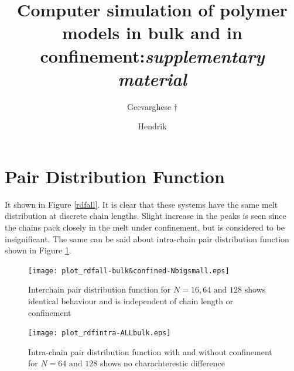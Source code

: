 \documentclass[10pt,aps,pre,raggedfooter,twocolumn,twoside,longbibliography,superscriptaddress,floatfix]{revtex4-1}
\begin{document}
\title{Computer simulation of polymer models in bulk and in confinement:\textit{supplementary material}}
\author{Geevarghese $\dagger$}
\author{Hendrik \vspace*{3.5mm}}



\maketitle
\thispagestyle{frontmatter} %
\section{\label{rdfintro}Pair Distribution Function}
 It shown in Figure \ref{rdfall}. It is clear that these systems have the same melt distribution at discrete chain lengths.  Slight increase in the peaks is seen since the chains pack closely in the melt under confinement, but is considered to be insignificant. The same can be said about intra-chain pair distribution function shown in Figure \ref{rdfintra}. 
 \begin{figure}
 \texttt{[image: plot\_rdfall-bulk\&confined-Nbigsmall.eps]}
 \caption{\label{rdfall}Interchain pair distribution function for $N=16, 64 \textrm{ and } 128$ shows identical behaviour and is independent of chain length or confinement}
 \texttt{[image: plot\_rdfintra-ALLbulk.eps]}
 \caption{\label{rdfintra}Intra-chain pair distribution function with and without confinement for $N=64 \textrm{ and } 128$ shows no charachterestic difference}
 \end{figure}



% 
\end{document}
